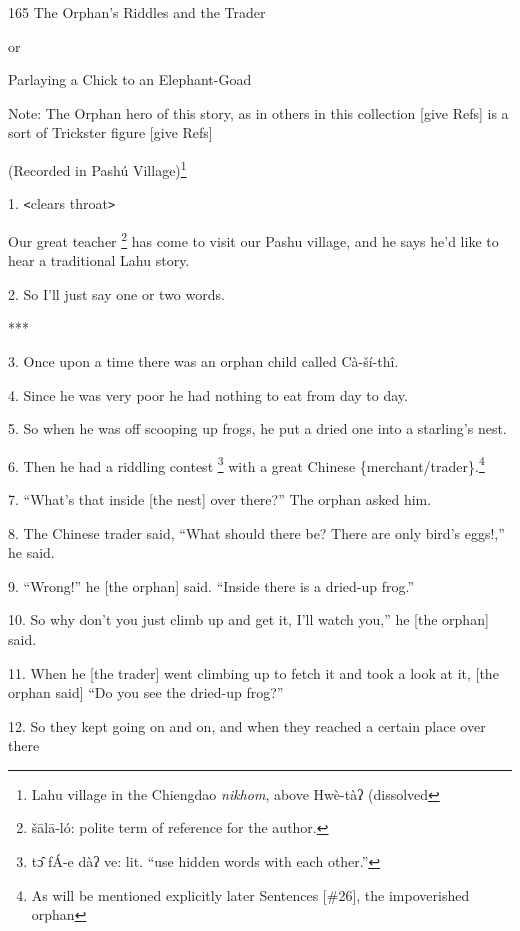 
165 The Orphan's Riddles and the Trader

or

Parlaying a Chick to an Elephant-Goad

Note: The Orphan hero of this story, as in others in this collection [give Refs]
is a sort of Trickster figure [give Refs]

(Recorded in Pashú Village)\footnote{Lahu village in the Chiengdao \textit{nikhom}, above Hwè-tàʔ (dissolved}

1. \texttt{<}clears throat\texttt{>}

Our great teacher \footnote{šālā-ló: polite term of reference for the author.} has come to visit our Pashu village, and he says he'd like
to hear a traditional Lahu story.

2. So I'll just say one or two words.

***

3. Once upon a time there was an orphan child called Cà-ší-thî.

4. Since he was very poor he had nothing to eat from day to day.

5. So when he was off scooping up frogs, he put a dried one into a starling's nest.

6. Then he had a riddling contest \footnote{tɔ̂ fÁ-e dàʔ ve: lit. ``use hidden words with each other.''} with a great Chinese \{merchant/trader\}.\footnote{As will be mentioned explicitly later Sentences [\#26], the impoverished orphan}

7. ``What's that inside [the nest] over there?'' The orphan asked him.

8. The Chinese trader said, ``What should there be? There are only bird's eggs!,''
he said.

9. ``Wrong!'' he [the orphan] said. ``Inside there is a dried-up frog.''

10. So why don't you just climb up and get it, I'll watch you,'' he [the orphan]
said.

11. When he [the trader] went climbing up to fetch it and took a look at it, [the
orphan said] ``Do you see the dried-up frog?''

12. So they kept going on and on, and when they reached a certain place over there
